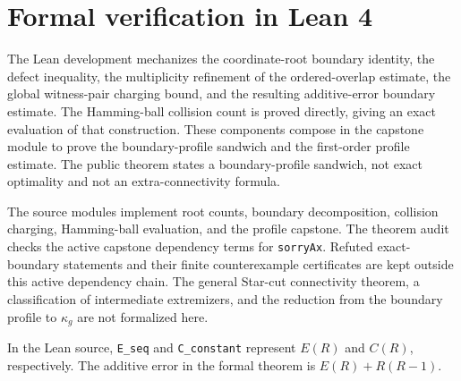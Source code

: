 \section{Formal verification in Lean 4}\label{app:lean}

The Lean development mechanizes the coordinate-root boundary identity, the
defect inequality, the multiplicity refinement of the ordered-overlap estimate,
the global witness-pair charging bound, and the resulting additive-error
boundary estimate. The Hamming-ball collision count is proved directly, giving an
exact evaluation of that construction. These components compose in the
capstone module to prove the boundary-profile sandwich and the first-order
profile estimate. The public theorem states a boundary-profile sandwich, not
exact optimality and not an extra-connectivity formula.

The source modules implement root counts, boundary decomposition, collision
charging, Hamming-ball evaluation, and the profile capstone. The theorem audit
checks the active capstone dependency terms for \texttt{sorryAx}. Refuted
exact-boundary statements and their
finite counterexample certificates are kept outside this active dependency
chain. The general Star-cut connectivity theorem, a classification of
intermediate extremizers, and the reduction from the boundary profile to
$\kappa_g$ are not formalized here.

In the Lean source, \texttt{E\_seq} and \texttt{C\_constant} represent
$E(R)$ and $C(R)$, respectively. The additive error in the formal theorem is
$E(R)+R(R-1)$.
